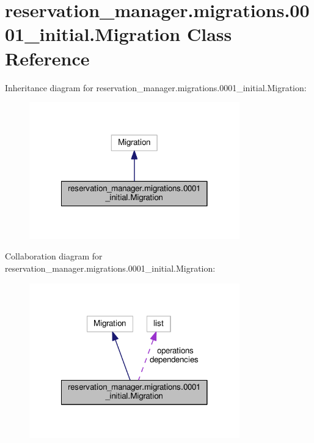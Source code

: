 \hypertarget{classreservation__manager_1_1migrations_1_10001__initial_1_1Migration}{\section{reservation\-\_\-manager.\-migrations.0001\-\_\-initial.Migration Class Reference}
\label{classreservation__manager_1_1migrations_1_10001__initial_1_1Migration}
}


Inheritance diagram for reservation\-\_\-manager.\-migrations.0001\-\_\-initial.Migration\-:
\nopagebreak
\begin{figure}[H]
\begin{center}
\leavevmode
\includegraphics[width=258pt]{classreservation__manager_1_1migrations_1_10001__initial_1_1Migration__inherit__graph}
\end{center}
\end{figure}


Collaboration diagram for reservation\-\_\-manager.\-migrations.0001\-\_\-initial.Migration\-:
\nopagebreak
\begin{figure}[H]
\begin{center}
\leavevmode
\includegraphics[width=258pt]{classreservation__manager_1_1migrations_1_10001__initial_1_1Migration__coll__graph}
\end{center}
\end{figure}
